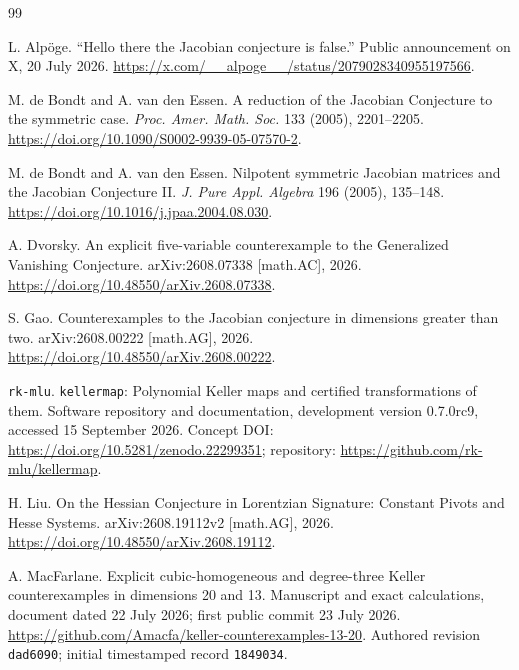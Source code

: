 \documentclass[11pt]{article}
\theoremstyle{remark}
\begin{document}
\begin{thebibliography}{99}

L. Alp\"oge.
\newblock ``Hello there the Jacobian conjecture is false.''
\newblock Public announcement on X, 20 July 2026.
\newblock \url{https://x.com/__alpoge__/status/2079028340955197566}.

M. de Bondt and A. van den Essen.
\newblock A reduction of the Jacobian Conjecture to the symmetric case.
\newblock \emph{Proc. Amer. Math. Soc.} 133 (2005), 2201--2205.
\newblock \url{https://doi.org/10.1090/S0002-9939-05-07570-2}.

M. de Bondt and A. van den Essen.
\newblock Nilpotent symmetric Jacobian matrices and the Jacobian Conjecture II.
\newblock \emph{J. Pure Appl. Algebra} 196 (2005), 135--148.
\newblock \url{https://doi.org/10.1016/j.jpaa.2004.08.030}.

A. Dvorsky.
\newblock An explicit five-variable counterexample to the Generalized Vanishing Conjecture.
\newblock arXiv:2608.07338 [math.AC], 2026.
\newblock \url{https://doi.org/10.48550/arXiv.2608.07338}.

S. Gao.
\newblock Counterexamples to the Jacobian conjecture in dimensions greater than two.
\newblock arXiv:2608.00222 [math.AG], 2026.
\newblock \url{https://doi.org/10.48550/arXiv.2608.00222}.

\texttt{rk-mlu}.
\newblock \texttt{kellermap}: Polynomial Keller maps and certified transformations of them.
\newblock Software repository and documentation, development version 0.7.0rc9, accessed 15 September 2026.
\newblock Concept DOI: \url{https://doi.org/10.5281/zenodo.22299351}; repository: \url{https://github.com/rk-mlu/kellermap}.

H. Liu.
\newblock On the Hessian Conjecture in Lorentzian Signature: Constant Pivots and Hesse Systems.
\newblock arXiv:2608.19112v2 [math.AG], 2026.
\newblock \url{https://doi.org/10.48550/arXiv.2608.19112}.

A. MacFarlane.
\newblock Explicit cubic-homogeneous and degree-three Keller counterexamples in dimensions 20 and 13.
\newblock Manuscript and exact calculations, document dated 22 July 2026; first public commit 23 July 2026.
\newblock \url{https://github.com/Amacfa/keller-counterexamples-13-20}.
\newblock Authored revision \texttt{dad6090}; initial timestamped record \texttt{1849034}.


\end{thebibliography}
\end{document}
